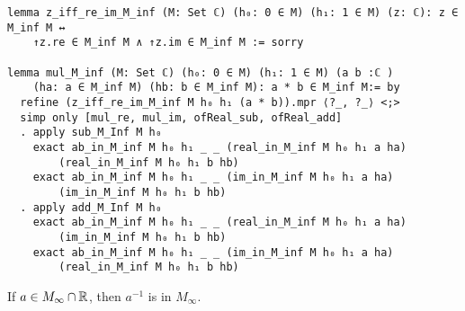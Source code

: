 \begin{lstlisting}
lemma z_iff_re_im_M_inf (M: Set ℂ) (h₀: 0 ∈ M) (h₁: 1 ∈ M) (z: ℂ): z ∈ M_inf M ↔
    ↑z.re ∈ M_inf M ∧ ↑z.im ∈ M_inf M := sorry

lemma mul_M_inf (M: Set ℂ) (h₀: 0 ∈ M) (h₁: 1 ∈ M) (a b :ℂ ) 
    (ha: a ∈ M_inf M) (hb: b ∈ M_inf M): a * b ∈ M_inf M:= by
  refine (z_iff_re_im_M_inf M h₀ h₁ (a * b)).mpr ⟨?_, ?_⟩ <;>
  simp only [mul_re, mul_im, ofReal_sub, ofReal_add]
  . apply sub_M_Inf M h₀
    exact ab_in_M_inf M h₀ h₁ _ _ (real_in_M_inf M h₀ h₁ a ha) 
        (real_in_M_inf M h₀ h₁ b hb)
    exact ab_in_M_inf M h₀ h₁ _ _ (im_in_M_inf M h₀ h₁ a ha) 
        (im_in_M_inf M h₀ h₁ b hb)
  . apply add_M_Inf M h₀
    exact ab_in_M_inf M h₀ h₁ _ _ (real_in_M_inf M h₀ h₁ a ha) 
        (im_in_M_inf M h₀ h₁ b hb)
    exact ab_in_M_inf M h₀ h₁ _ _ (im_in_M_inf M h₀ h₁ a ha)
        (real_in_M_inf M h₀ h₁ b hb)
\end{lstlisting}

\begin{lemma}
    \label{lem:construction_inv}
    \leanok
    If $a \in M_{\infty}\cap\mathbb{R}$, then $a^{-1}$ is in  $M_{\infty}$.
\end{lemma}

